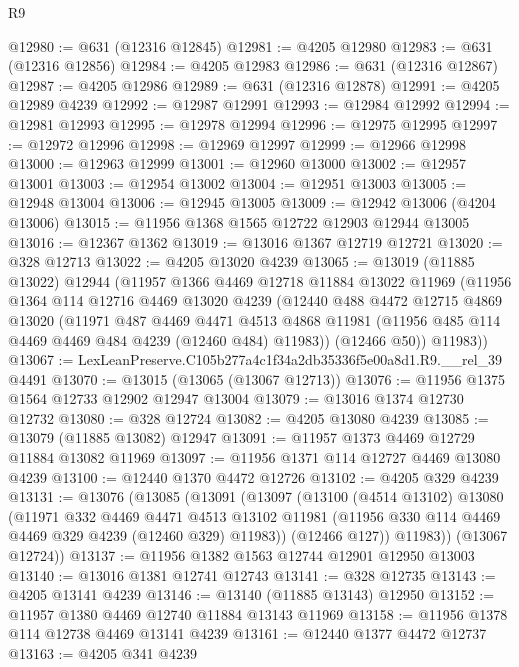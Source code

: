\begin{lexlean}{R9}
\begin{coremodule}
@12980 := @631 (@12316 @12845)
@12981 := @4205 @12980
@12983 := @631 (@12316 @12856)
@12984 := @4205 @12983
@12986 := @631 (@12316 @12867)
@12987 := @4205 @12986
@12989 := @631 (@12316 @12878)
@12991 := @4205 @12989 @4239
@12992 := @12987 @12991
@12993 := @12984 @12992
@12994 := @12981 @12993
@12995 := @12978 @12994
@12996 := @12975 @12995
@12997 := @12972 @12996
@12998 := @12969 @12997
@12999 := @12966 @12998
@13000 := @12963 @12999
@13001 := @12960 @13000
@13002 := @12957 @13001
@13003 := @12954 @13002
@13004 := @12951 @13003
@13005 := @12948 @13004
@13006 := @12945 @13005
@13009 := @12942 @13006 (@4204 @13006)
@13015 := @11956 @1368 @1565 @12722 @12903 @12944 @13005
@13016 := @12367 @1362
@13019 := @13016 @1367 @12719 @12721
@13020 := @328 @12713
@13022 := @4205 @13020 @4239
@13065 := @13019
    (@11885 @13022)
    @12944
    (@11957
      @1366
      @4469
      @12718
      @11884
      @13022
      @11969
      (@11956
        @1364
        @114
        @12716
        @4469
        @13020
        @4239
        (@12440
          @488
          @4472
          @12715
          @4869
          @13020
          (@11971
            @487
            @4469
            @4471
            @4513
            @4868
            @11981
            (@11956 @485 @114 @4469 @4469 @484 @4239 (@12460 @484) @11983))
          (@12466 @50))
        @11983))
@13067 := LexLeanPreserve.C105b277a4c1f34a2db35336f5e00a8d1.R9.__rel_39 @4491
@13070 := @13015 (@13065 (@13067 @12713))
@13076 := @11956 @1375 @1564 @12733 @12902 @12947 @13004
@13079 := @13016 @1374 @12730 @12732
@13080 := @328 @12724
@13082 := @4205 @13080 @4239
@13085 := @13079 (@11885 @13082) @12947
@13091 := @11957 @1373 @4469 @12729 @11884 @13082 @11969
@13097 := @11956 @1371 @114 @12727 @4469 @13080 @4239
@13100 := @12440 @1370 @4472 @12726
@13102 := @4205 @329 @4239
@13131 := @13076
    (@13085
      (@13091
        (@13097
          (@13100
            (@4514 @13102)
            @13080
            (@11971
              @332
              @4469
              @4471
              @4513
              @13102
              @11981
              (@11956 @330 @114 @4469 @4469 @329 @4239 (@12460 @329) @11983))
            (@12466 @127))
          @11983))
      (@13067 @12724))
@13137 := @11956 @1382 @1563 @12744 @12901 @12950 @13003
@13140 := @13016 @1381 @12741 @12743
@13141 := @328 @12735
@13143 := @4205 @13141 @4239
@13146 := @13140 (@11885 @13143) @12950
@13152 := @11957 @1380 @4469 @12740 @11884 @13143 @11969
@13158 := @11956 @1378 @114 @12738 @4469 @13141 @4239
@13161 := @12440 @1377 @4472 @12737
@13163 := @4205 @341 @4239

\end{coremodule}
\end{lexlean}
